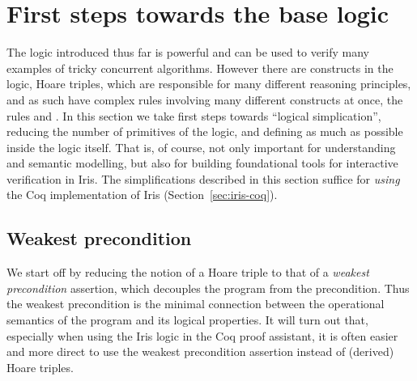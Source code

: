 \section{First steps towards the base logic }
\label{sec:first-steps-towards-base-logic}

The logic introduced thus far is powerful and can be used to verify many examples of tricky concurrent algorithms.
However there are constructs in the logic, \eg{} Hoare triples, which are responsible for many different reasoning principles, and as such have complex rules involving many different constructs at once, \eg{} the rules  and .
In this section we take first steps towards ``logical simplication'', reducing the number of primitives of the logic, and defining as much as possible inside the logic itself.
That is, of course, not only important for understanding and semantic modelling, but also for building foundational tools for interactive verification in Iris.
The simplifications described in this section suffice for \emph{using} the Coq implementation of Iris (Section~\ref{sec:iris-coq}).


\subsection{Weakest precondition}
\label{sec:weakest-pre}

We start off by reducing the notion of a Hoare triple to that of a \emph{weakest precondition} assertion, which decouples the program from the precondition.
Thus the weakest precondition is the minimal connection between the operational semantics of the program and its logical properties.
It will turn out that, especially when using the Iris logic in the Coq proof assistant, it is often easier and more direct to use the weakest precondition assertion instead of (derived) Hoare triples.

